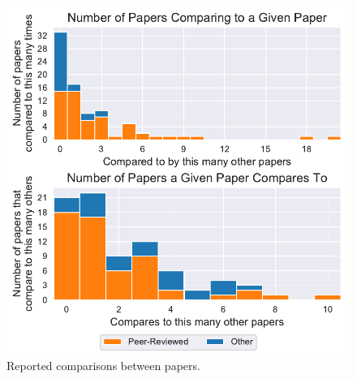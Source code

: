 



\begin{figure}[h]
\begin{center}
\includegraphics[width=\linewidth]{paper_comparisons_hist}
\caption{Reported comparisons between papers.
}
\label{fig:paper_comparisons_hist}
\end{center}
\end{figure}

